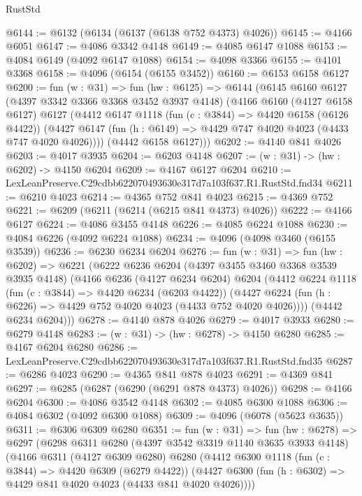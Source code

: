 \begin{lexlean}{RustStd}
\begin{coremodule}
@6144 := @6132 (@6134 (@6137 (@6138 @752 @4373) @4026))
@6145 := @4166 @6051
@6147 := @4086 @3342 @4148
@6149 := @4085 @6147 @1088
@6153 := @4084 @6149 (@4092 @6147 @1088)
@6154 := @4098 @3366
@6155 := @4101 @3368
@6158 := @4096 (@6154 (@6155 @3452))
@6160 := @6153 @6158 @6127
@6200 := fun (w : @31) =>
  fun (hw : @6125) =>
  @6144
    (@6145
      @6160
      @6127
      (@4397 @3342 @3366 @3368 @3452 @3937 @4148)
      (@4166
        @6160
        (@4127 @6158 @6127)
        @6127
        (@4412
          @6147
          @1118
          (fun (c : @3844) => @4420 @6158 (@6126 @4422))
          (@4427 @6147 (fun (h : @6149) => @4429 @747 @4020 @4023 (@4433 @747 @4020 @4026))))
        (@4442 @6158 @6127)))
@6202 := @4140 @841 @4026
@6203 := @4017 @3935
@6204 := @6203 @4148
@6207 := (w : @31) -> (hw : @6202) -> @4150 @6204
@6209 := @4167 @6127 @6204
@6210 := LexLeanPreserve.C29cdbb622070493630e317d7a103f637.R1.RustStd.fnd34
@6211 := @6210 @4023
@6214 := @4365 @752 @841 @4023
@6215 := @4369 @752
@6221 := @6209 (@6211 (@6214 (@6215 @841 @4373) @4026))
@6222 := @4166 @6127
@6224 := @4086 @3455 @4148
@6226 := @4085 @6224 @1088
@6230 := @4084 @6226 (@4092 @6224 @1088)
@6234 := @4096 (@4098 @3460 (@6155 @3539))
@6236 := @6230 @6234 @6204
@6276 := fun (w : @31) =>
  fun (hw : @6202) =>
  @6221
    (@6222
      @6236
      @6204
      (@4397 @3455 @3460 @3368 @3539 @3935 @4148)
      (@4166
        @6236
        (@4127 @6234 @6204)
        @6204
        (@4412
          @6224
          @1118
          (fun (c : @3844) => @4420 @6234 (@6203 @4422))
          (@4427 @6224 (fun (h : @6226) => @4429 @752 @4020 @4023 (@4433 @752 @4020 @4026))))
        (@4442 @6234 @6204)))
@6278 := @4140 @878 @4026
@6279 := @4017 @3933
@6280 := @6279 @4148
@6283 := (w : @31) -> (hw : @6278) -> @4150 @6280
@6285 := @4167 @6204 @6280
@6286 := LexLeanPreserve.C29cdbb622070493630e317d7a103f637.R1.RustStd.fnd35
@6287 := @6286 @4023
@6290 := @4365 @841 @878 @4023
@6291 := @4369 @841
@6297 := @6285 (@6287 (@6290 (@6291 @878 @4373) @4026))
@6298 := @4166 @6204
@6300 := @4086 @3542 @4148
@6302 := @4085 @6300 @1088
@6306 := @4084 @6302 (@4092 @6300 @1088)
@6309 := @4096 (@6078 (@5623 @3635))
@6311 := @6306 @6309 @6280
@6351 := fun (w : @31) =>
  fun (hw : @6278) =>
  @6297
    (@6298
      @6311
      @6280
      (@4397 @3542 @3319 @1140 @3635 @3933 @4148)
      (@4166
        @6311
        (@4127 @6309 @6280)
        @6280
        (@4412
          @6300
          @1118
          (fun (c : @3844) => @4420 @6309 (@6279 @4422))
          (@4427 @6300 (fun (h : @6302) => @4429 @841 @4020 @4023 (@4433 @841 @4020 @4026))))

\end{coremodule}
\end{lexlean}
